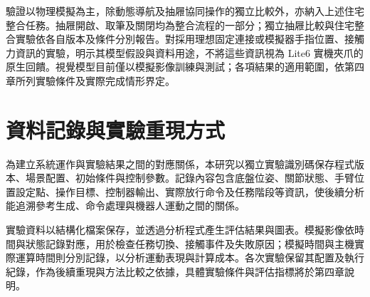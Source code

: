 驗證以物理模擬為主，除動態導航及抽屜協同操作的獨立比較外，亦納入上述住宅整合任務。抽屜開啟、取筆及關閉均為整合流程的一部分；獨立抽屜比較與住宅整合實驗依各自版本及條件分別報告。對採用理想固定連接或模擬器手指位置、接觸力資訊的實驗，明示其模型假設與資料用途，不將這些資訊視為 Lite6 實機夾爪的原生回饋。視覺模型目前僅以模擬影像訓練與測試；各項結果的適用範圍，依第四章所列實驗條件及實際完成情形界定。

\section{資料記錄與實驗重現方式}
\label{sec:data_recording_reproducibility}

為建立系統運作與實驗結果之間的對應關係，本研究以獨立實驗識別碼保存程式版本、場景配置、初始條件與控制參數。記錄內容包含底盤位姿、關節狀態、手臂位置設定點、操作目標、控制器輸出、實際放行命令及任務階段等資訊，使後續分析能追溯參考生成、命令處理與機器人運動之間的關係。

實驗資料以結構化檔案保存，並透過分析程式產生評估結果與圖表。模擬影像依時間與狀態記錄對應，用於檢查任務切換、接觸事件及失敗原因；模擬時間與主機實際運算時間則分別記錄，以分析運動表現與計算成本。各次實驗保留其配置及執行紀錄，作為後續重現與方法比較之依據，具體實驗條件與評估指標將於第四章說明。
